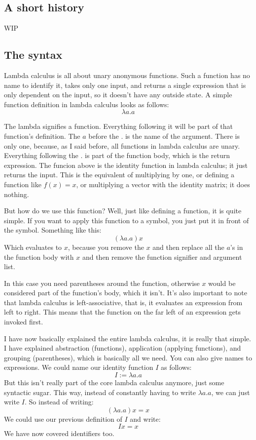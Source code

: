 \documentclass[a4paper]{article}
\begin{document}
\subsection{A short history}


WIP

\subsection{The syntax}

Lambda calculus is all about unary anonymous functions. Such a function has no
name to identify it, takes only one input, and returns a single expression that
is only dependent on the input, so it doesn't have any outside state. A simple
function definition in lambda calculus looks as follows:
\[\lambda a.a\]

The lambda signifies a function. Everything following it will be part of that
function's definition. The \(a\) before the \(.\) is the name of the argument.
There is only one, because, as I said before, all functions in lambda calculus
are unary. Everything following the \(.\) is part of the function body, which
is the return expression. The funcion above is the identity function in lambda
calculus; it just returns the input. This is the equivalent of multiplying by
one, or defining a function like \(f(x)=x\), or multiplying a vector with the
identity matrix; it does nothing.

But how do we use this function? Well, just like defining a function, it is
quite simple. If you want to apply this function to a symbol, you just put it
in front of the symbol. Something like this:
\[(\lambda a.a)x\]
Which evaluates to \(x\), because you remove the \(x\) and then replace all the
\(a\)'s in the function body with \(x\) and then remove the function signifier
and argument list.

In this case you need parentheses around the function, otherwise \(x\) would be
considered part of the function's body, which it isn't. It's also important to
note that lambda calculus is left-associative, that is, it evaluates an
expression from left to right. This means that the function on the far left of
an expression gets invoked first.

I have now basically explained the entire lambda calculus, it is really that
simple. I have explained abstraction (functions), application (applying
functions), and grouping (parentheses), which is basically all we need. You
can also give names to expressions. We could name our identity function \(I\)
as follows: \[I:=\lambda a.a\] But this isn't really part of the core lambda
calculus anymore, just some syntactic sugar. This way, instead of constantly
having to write \(\lambda a.a\), we can just write \(I\). So instead of
writing: \[(\lambda a.a)x=x\] We could use our previous definition of \(I\) and
write: \[Ix=x\] We have now covered identifiers too.
\end{document}
